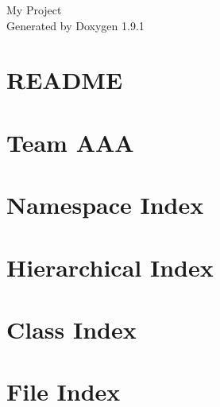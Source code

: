 \let\mypdfximage\pdfximage\def\pdfximage{\immediate\mypdfximage}\documentclass[twoside]{book}
\newcommand{\+}{\discretionary{\mbox{\scriptsize$\hookleftarrow$}}{}{}}
\newcommand{\clearemptydoublepage}{%
  \newpage{\pagestyle{empty}\cleardoublepage}%
}
\begin{document}
\raggedbottom

\hypersetup{pageanchor=false,
             bookmarksnumbered=true,
             pdfencoding=unicode
            }
\begin{titlepage}
\vspace*{7cm}
\begin{center}%
{\Large My Project }\\
\vspace*{1cm}
{\large Generated by Doxygen 1.9.1}\\
\end{center}
\end{titlepage}
\clearemptydoublepage
{}
\tableofcontents
\clearemptydoublepage
{}
\hypersetup{pageanchor=true}

\chapter{README}
\label{md_mysite_core_paser__r_e_a_d_m_e}

\chapter{Team AAA}
\label{md__r_e_a_d_m_e}

\chapter{Namespace Index}

\chapter{Hierarchical Index}

\chapter{Class Index}

\chapter{File Index}

\end{document}
